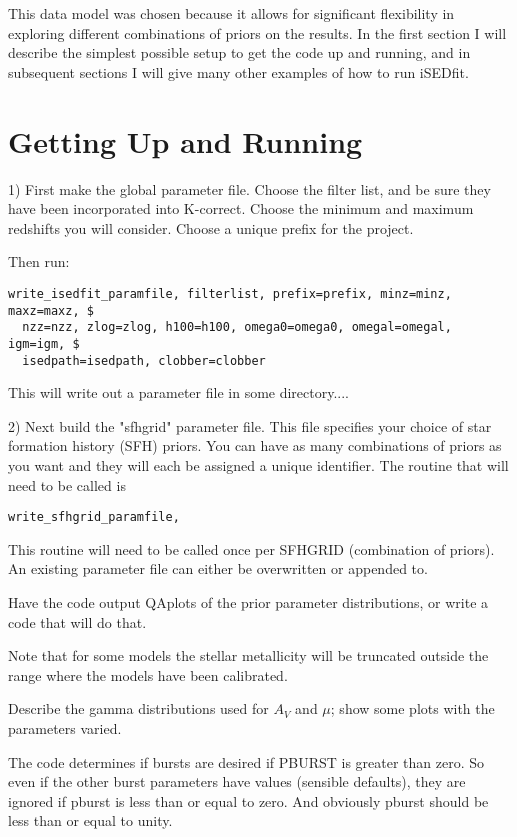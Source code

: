 \documentclass[12pt,preprint]{aastex}
\begin{document}
This data model was chosen because it allows for significant
flexibility in exploring different combinations of priors on the
results.  In the first section I will describe the simplest possible
setup to get the code up and running, and in subsequent sections I
will give many other examples of how to run iSEDfit.

\section{Getting Up and Running}

1) First make the global parameter file.  Choose the filter list, and
be sure they have been incorporated into K-correct.  Choose the
minimum and maximum redshifts you will consider.  Choose a unique
prefix for the project.

Then run: 

\begin{verbatim}
write_isedfit_paramfile, filterlist, prefix=prefix, minz=minz, maxz=maxz, $
  nzz=nzz, zlog=zlog, h100=h100, omega0=omega0, omegal=omegal, igm=igm, $
  isedpath=isedpath, clobber=clobber
\end{verbatim}

This will write out a parameter file in some directory....

2) Next build the "sfhgrid" parameter file.  This file specifies your
choice of star formation history (SFH) priors.  You can have as many
combinations of priors as you want and they will each be assigned a
unique identifier.  The routine that will need to be called is

\begin{verbatim}
write_sfhgrid_paramfile, 
\end{verbatim}


This routine will need to be called once per SFHGRID (combination of
priors).  An existing parameter file can either be overwritten or
appended to.
  

Have the code output QAplots of the prior parameter distributions, or
write a code that will do that.

Note that for some models the stellar metallicity will be truncated
outside the range where the models have been calibrated.

Describe the gamma distributions used for $A_V$ and $\mu$; show some
plots with the parameters varied.

The code determines if bursts are desired if PBURST is greater than
zero.  So even if the other burst parameters have values (sensible
defaults), they are ignored if pburst is less than or equal to zero.
And obviously pburst should be less than or equal to unity.
  
\end{document}
